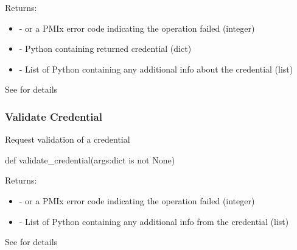 Returns:
\begin{itemize}
    \item {} -  or a \ac{PMIx} error code indicating the operation failed (integer)
    \item {} - Python  containing returned credential (dict)
    \item {} - List of Python  containing any additional info about the credential (list)
\end{itemize}

See  for details


\subsubsection{Validate Credential}

\summary

Request validation of a credential

\format

\pyspecificstart
\begin{codepar}
def validate_credential(args:dict is not None)
\end{codepar}
\pyspecificend

\begin{arglist}
\end{arglist}

Returns:
\begin{itemize}
    \item {} -  or a \ac{PMIx} error code indicating the operation failed (integer)
    \item {} - List of Python  containing any additional info from the credential (list)
\end{itemize}

See  for details



